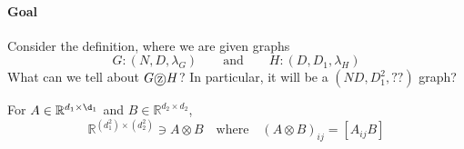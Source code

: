 \documentclass[11pt, letter]{book}
\newcommand{\real}{\mathbb{R}}
\newcommand*\tcircle[1]{%
  \raisebox{-0.5pt}{%
    \textcircled{#1}%
  }%
}
\begin{document}
\paragraph{Goal} Consider the definition, where we are given graphs
\begin{equation}
	G: (N, D, \lambda_G) \quad \quad 
	\text{and} \quad \quad H : (D, D_1, \lambda_H)
\end{equation}
What can we tell about $G \tcircle {z} H$? In particular, it will be a $(ND, D_1^2, ??)$ graph? 

\begin{definition}
	For $A \in \real^{d_1 \times \d_1}$ and $B \in \real^{d_2 \times d_2}$, 
	\begin{equation}
		\real^{(d_1^2 )\times (d_2^2)} \ni A \otimes B \quad \text{where} \quad (A \otimes B)_{ij} = [A_{ij}B]
	\end{equation}
\end{definition}
\end{document}
